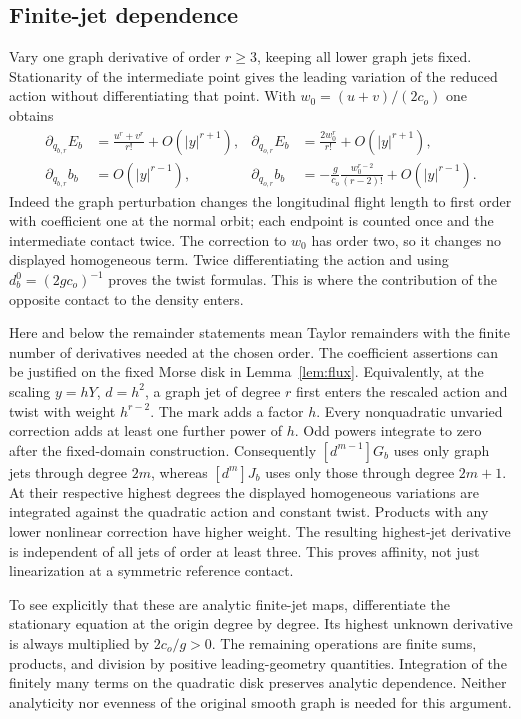 \subsection{Finite-jet dependence}
Vary one graph derivative of order $r\ge3$, keeping all lower graph
jets fixed. Stationarity of the intermediate point gives the leading
variation of the reduced action without differentiating that point.
With $w_0=(u+v)/(2c_o)$ one obtains
\begin{align}
 \partial_{q_{b,r}}E_b&=\frac{u^r+v^r}{r!}+O(|y|^{r+1}),
       &\partial_{q_{o,r}}E_b&=\frac{2w_0^r}{r!}+O(|y|^{r+1}),
                                                \label{eq:variationE}\\
 \partial_{q_{b,r}}b_b&=O(|y|^{r-1}),
       &\partial_{q_{o,r}}b_b&=-\frac{g}{c_o}
                    \frac{w_0^{r-2}}{(r-2)!}+O(|y|^{r-1}).
                                                \label{eq:variationb}
\end{align}
Indeed the graph perturbation changes the longitudinal flight length
to first order with coefficient one at the normal orbit; each endpoint
is counted once and the intermediate contact twice. The correction to
$w_0$ has order two, so it changes no displayed homogeneous term.
Twice differentiating the action and using $d_b^0=(2gc_o)^{-1}$
proves the twist formulas. This is where the contribution of the
opposite contact to the density enters.

Here and below the remainder statements mean Taylor remainders with
the finite number of derivatives needed at the chosen order. The
coefficient assertions can be justified on the fixed Morse disk in
Lemma~\ref{lem:flux}. Equivalently, at the scaling $y=hY$, $d=h^2$,
a graph jet of degree $r$ first enters the rescaled action and twist
with weight $h^{r-2}$. The mark adds a factor $h$. Every nonquadratic
unvaried correction adds at least one further power of $h$. Odd powers
integrate to zero after the fixed-domain construction.
Consequently $[d^{m-1}]G_b$ uses only graph jets through degree $2m$,
whereas $[d^m]J_b$ uses only those through degree $2m+1$.
At their respective highest degrees the displayed homogeneous
variations are integrated against the quadratic action and constant
twist. Products with any lower nonlinear correction have higher weight.
The resulting highest-jet derivative is independent of all jets of
order at least three. This proves affinity, not just linearization at
a symmetric reference contact.

To see explicitly that these are analytic finite-jet maps, differentiate
the stationary equation at the origin degree by degree. Its highest
unknown derivative is always multiplied by $2c_o/g>0$. The remaining
operations are finite sums, products, and division by positive
leading-geometry quantities. Integration of the finitely many terms on
the quadratic disk preserves analytic dependence. Neither analyticity
nor evenness of the original smooth graph is needed for this argument.

